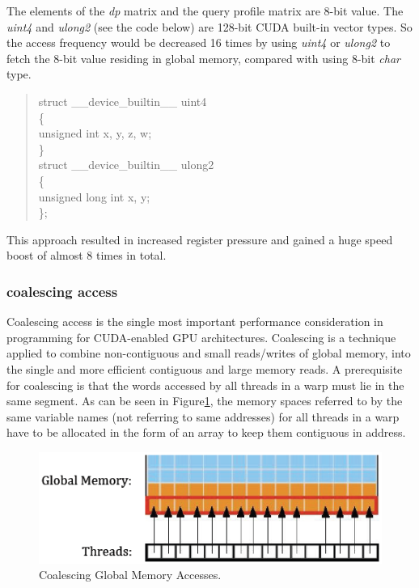 The elements of the \emph{dp} matrix and the query profile matrix are 8-bit value.  The \emph{uint4} and \emph{ulong2} (see the code below) are 128-bit CUDA built-in vector types. So the access frequency would be decreased 16 times by using \emph{uint4} or \emph{ulong2} to fetch the 8-bit value residing in global memory, compared with using 8-bit \emph{char} type.

\begin{quote}
\selectfont
struct \_\_device\_builtin\_\_ uint4\\
\{\\
   unsigned int x, y, z, w;\\
\}\\
struct \_\_device\_builtin\_\_ ulong2\\
\{\\
    unsigned long int x, y;\\
\};\\
\end{quote}

This approach resulted in increased register pressure and gained a huge speed boost of almost 8 times in total.

\subsubsection*{coalescing access}

Coalescing access is the single most important performance consideration in programming for CUDA-enabled GPU architectures. Coalescing is a technique applied to combine non-contiguous and small reads/writes of global memory, into the single and more efficient contiguous and large memory reads. A prerequisite for coalescing is that the words accessed by all threads in a warp must lie in the same segment. As can be seen in Figure\ref{fig:coalescing}, the memory spaces referred to by the same variable names (not referring to same addresses) for all threads in a warp have to be allocated in the form of an array to keep them contiguous in address.

\begin{figure}[!htb]
	\centering
	\includegraphics[totalheight=0.115\textheight]{Figures/coalesce.png}
	\caption{\selectfont Coalescing Global Memory Accesses\citep{Waters}.}
	\label{fig:coalescing}
\end{figure}

